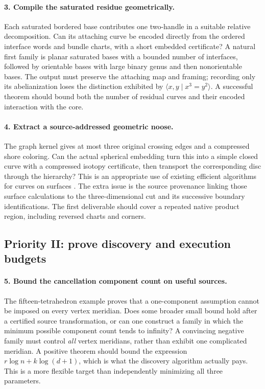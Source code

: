 \paragraph{3. Compile the saturated residue geometrically.}
Each saturated bordered base contributes one two-handle in a suitable relative
decomposition. Can its attaching curve be encoded directly from the ordered
interface words and bundle charts, with a short embedded certificate? A
natural first family is planar saturated bases with a bounded number of
interfaces, followed by orientable bases with large binary genus and then
nonorientable bases. The output must preserve the attaching map and framing;
recording only its abelianization loses the distinction exhibited by
$\langle x,y\mid x^3=y^2\rangle$. A successful theorem should bound both
the number of residual curves and their encoded interaction with the core.

\paragraph{4. Extract a source-addressed geometric noose.}
The graph kernel gives at most three original crossing edges and a compressed
shore coloring. Can the actual spherical embedding turn this into a simple
closed curve with a compressed isotopy certificate, then transport the
corresponding disc through the hierarchy? This is an appropriate use of
existing efficient algorithms for curves on surfaces
\cite{lackenby-curves}. The extra issue is the source provenance linking those
surface calculations to the three-dimensional cut and its successive boundary
identifications. The first deliverable should cover a repeated native product
region, including reversed charts and corners.

\subsection{Priority II: prove discovery and execution budgets}

\paragraph{5. Bound the cancellation component count on useful sources.}
The fifteen-tetrahedron example proves that a one-component assumption cannot
be imposed on every vertex meridian. Does some broader small bound hold after
a certified source transformation, or can one construct a family in which the
minimum possible component count tends to infinity? A convincing negative
family must control \emph{all} vertex meridians, rather than exhibit one
complicated meridian. A positive theorem should bound the expression
$r\log n+k\log(d+1)$, which is what the discovery algorithm actually pays.
This is a more flexible target than independently minimizing all three
parameters.

